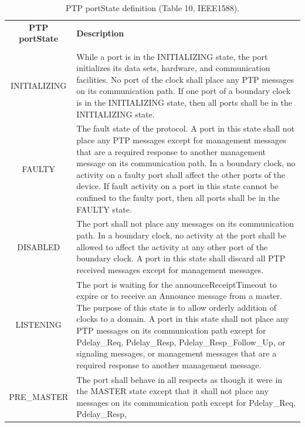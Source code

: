 \documentclass[a4paper, 12pt]{article}
\begin{document}
\begin{table}[hp!]
\caption{PTP portState definition (Table 10, IEEE1588).}
\centering
\begin{tabular}{| c | p{9.5cm} |}          \hline
\textbf{PTP portState}  &  \textbf{Description} \\ 
&   \\ \hline
\small
INITIALIZING       &  \small While a port is in the INITIALIZING state, the port initializes its 
		      data sets, hardware, and
		      communication facilities. No port of the clock shall place any PTP messages
		      on its
		      communication path. If one port of a boundary clock is in the INITIALIZING 
		      state, then all ports
		      shall be in the INITIALIZING state.  \\ \hline
FAULTY             &  \small The fault state of the protocol. A port in this state shall not place 
		      any PTP messages except for
		      management messages that are a required response to another management 
		      message on its
		      communication path. In a boundary clock, no activity on a faulty port  
		      shall affect the other ports
		      of the device. If fault activity on a port in this state cannot be confined 
		      to the faulty port, then all
		      ports shall be in the FAULTY state. \\ \hline
DISABLED           &  \small The port shall not place any messages on its communication path. In a
		      boundary clock, no
		      activity at the port shall be allowed to affect the activity at any other
		      port of the boundary clock.
		      A port in this state shall discard all PTP received messages except for 
		      management messages. \\ \hline
LISTENING          &  \small The port is waiting for the announceReceiptTimeout to expire or to
		      receive an Announce
		      message from a master. The purpose of this state is to allow orderly addition 
		      of clocks to a
		      domain. A port in this state shall not place any PTP messages on its 
		      communication path except
		      for Pdelay\_Req, Pdelay\_Resp, Pdelay\_Resp\_Follow\_Up, or signaling 
		      messages, or management
		      messages that are a required response to another management message. \\ \hline
PRE\_MASTER         & \small The port shall behave in all respects as though it were in the 
		      MASTER state except that it shall
		      not place any messages on its communication path except for Pdelay\_Req, 
		      Pdelay\_Resp,

\end{tabular}
\end{table}
\end{document}
